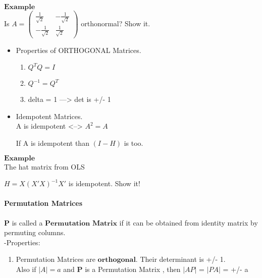 \documentclass[]{article}
\providecommand{\tightlist}{%
  \setlength{\itemsep}{0pt}\setlength{\parskip}{0pt}}
\let\oldparagraph\paragraph
\renewcommand{\paragraph}[1]{\oldparagraph{#1}\mbox{}}
\begin{document}
\(\mathbf{Example}\)\\
 Is
\(A =\begin{pmatrix} \frac{1}{\sqrt{2}} & -\frac{1}{\sqrt{2}} \\ -\frac{1}{\sqrt{2}} & \frac{1}{\sqrt{2}}\end{pmatrix}\)
orthonormal? Show it.\\

\begin{itemize}
\item
  Properties of ORTHOGONAL Matrices.\\

  \begin{enumerate}
  \def\labelenumi{\roman{enumi})}
  \tightlist
  \item
    \(Q^{T}Q=I\)\\
  \item
    \(Q^{-1}=Q^{T}\)\\
  \item
    \textbar{}delta\textbar{} = 1 ---\textgreater{} det is +/- 1\\
  \end{enumerate}
\item
  Idempotent Matrices.\\

  A is idempotent \textless{}--\textgreater{} \(A^{2}=A\)

  If A is idempotent than \((I - H)\) is too.
\end{itemize}

\(\mathbf{Example}\)\\
 The hat matrix from OLS

\(H=X(X'X)^{-1}X'\) is idempotent. Show it!

\paragraph{\texorpdfstring{Permutation Matrices\\
}{Permutation Matrices }}\label{permutation-matrices}

\(\textbf{P}\) is called a \(\textbf{Permutation Matrix}\) if it can be
obtained from identity matrix by permuting columns.\\

-Properties:

\begin{enumerate}
\def\labelenumi{\alph{enumi})}
\tightlist
\item
  Permutation Matrices are \(\textbf{orthogonal}\). Their determinant is
  +/- 1.\\
   Also if \(|A| = a\) and \(\textbf{P}\) is a Permutation Matrix , then
  \(|AP|\) = \(|PA|\) = +/- a\\
\end{enumerate}
\end{document}

